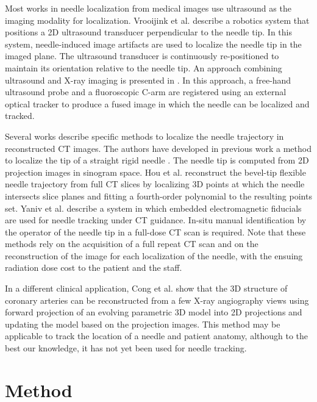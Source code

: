 Most works in needle localization from medical images use ultrasound as the imaging modality for localization. Vrooijink et al. \cite{vrooijink2013real} describe a robotics system that positions a 2D ultrasound transducer perpendicular to the needle tip. In this system, needle-induced image artifacts are used to localize the needle tip in the imaged plane. The ultrasound transducer is continuously re-positioned to maintain its orientation relative to the needle tip. An approach combining ultrasound and X-ray imaging is presented in \cite{marinetto2017integration}. In this approach, a free-hand ultrasound probe and a fluoroscopic C-arm are registered using an external optical tracker to produce a fused image in which the needle can be localized and tracked.

Several works describe specific methods to localize the needle trajectory in reconstructed CT images. The authors have developed in previous work a method to localize the tip of a straight rigid needle \cite{medan2017reduced}. The needle tip  is computed from 2D projection images in sinogram space. 
Hou et al. \cite{huo2015shape} reconstruct the bevel-tip flexible needle trajectory from full CT slices by localizing 3D points at which the needle intersects slice planes and fitting a fourth-order polynomial to the resulting points set.
Yaniv et al. \cite{yaniv2010needle} describe a system in which embedded electromagnetic fiducials are used for needle tracking under CT guidance. In-situ manual identification by the operator of the needle tip in a full-dose CT scan is required. Note that these methods rely on the acquisition of a full repeat CT scan and on the reconstruction of the image for each localization of the needle, with the ensuing radiation dose cost to the patient and the staff.

In a different clinical application, Cong et al.  \cite{cong2015quantitative} show that the 3D structure of coronary arteries can be reconstructed from a few X-ray angiography views using forward projection of an evolving parametric 3D model into 2D projections and updating the model based on the projection images. This method may be applicable to track the location of a needle and patient anatomy, although to the best our knowledge, it has not yet been used for needle tracking. 

\section*{Method}

